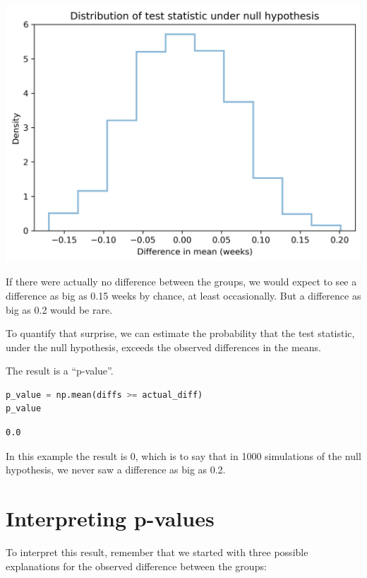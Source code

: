 \begin{center}
\includegraphics[scale=0.75]{11_inference_files/11_inference_79_0.png}
\end{center}

If there were actually no difference between the groups, we would expect
to see a difference as big as 0.15 weeks by chance, at least
occasionally. But a difference as big as 0.2 would be rare.

To quantify that surprise, we can estimate the probability that the test
statistic, under the null hypothesis, exceeds the observed differences
in the means.

The result is a ``p-value''.

\begin{lstlisting}[language=Python,style=source]
p_value = np.mean(diffs >= actual_diff)
p_value
\end{lstlisting}

\begin{lstlisting}[style=output]
0.0
\end{lstlisting}

In this example the result is 0, which is to say that in 1000
simulations of the null hypothesis, we never saw a difference as big as
0.2.

\hypertarget{interpreting-p-values}{%
\section{Interpreting p-values}\label{interpreting-p-values}}

To interpret this result, remember that we started with three possible
explanations for the observed difference between the groups:

